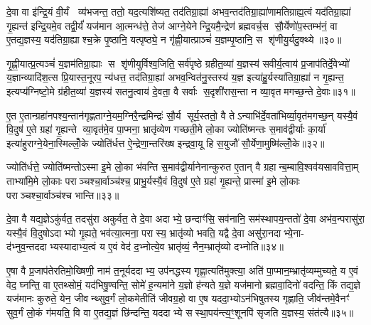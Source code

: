 {\anuvakamend[{अव॑ दाधार मि॒त्रेणै॒व प्री॑णाति॒ षट्च॑॥७॥}]}

दे॒वा वा इ॑न्द्रि॒यं वी॒र्यं  व्य॑भजन्त॒ ततो॒ यद॒त्यशि॑ष्यत॒ तद॑तिग्रा॒ह्या॑ अभव॒न्तद॑तिग्रा॒ह्या॑णामतिग्राह्य॒त्वं यद॑तिग्रा॒ह्या॑ गृ॒ह्यन्त॑ इन्द्रि॒यमे॒व तद्वी॒र्यं॑ यज॑मान आ॒त्मन्ध॑त्ते॒ तेज॑ आग्ने॒येनेन्द्रि॒यमै॒न्द्रेण॑ ब्रह्मवर्च॒स सौ॒र्येणो॑प॒स्तम्भ॑नं॒ वा ए॒तद्य॒ज्ञस्य॒ यद॑तिग्रा॒ह्याश्च॒क्रे पृ॒ष्ठानि॒ यत्पृष्ठ्ये॒ न गृ॑ह्णी॒यात्प्राञ्चं॑ य॒ज्ञम्पृ॒ष्ठानि॒ स शृ॑णीयु॒र्यदु॒क्थ्ये॥३०॥

गृ॒ह्णी॒यात्प्र॒त्यञ्चं॑ य॒ज्ञम॑तिग्रा॒ह्याः स शृ॑णीयुर्विश्व॒जिति॒ सर्व॑पृष्ठे ग्रहीत॒व्या॑ य॒ज्ञस्य॑ सवीर्य॒त्वाय॑ प्र॒जाप॑तिर्दे॒वेभ्यो॑ य॒ज्ञान्व्यादि॑श॒त्स प्रि॒यास्त॒नूरप॒ न्य॑धत्त॒ तद॑तिग्रा॒ह्या॑ अभव॒न्वित॑नु॒स्तस्य॑ य॒ज्ञ इत्या॑हु॒र्यस्या॑तिग्रा॒ह्या॑ न गृ॒ह्यन्त॒ इत्यप्य॑ग्निष्टो॒मे ग्र॑हीत॒व्या॑ य॒ज्ञस्य॑ सतनु॒त्वाय॑ दे॒वता॒ वै सर्वाः स॒दृशी॑रास॒न्ता न व्या॒वृतमगच्छ॒न्ते दे॒वाः॥३१॥

ए॒त ए॒तान्ग्रहा॑नपश्य॒न्तान॑गृह्णताग्ने॒यम॒ग्निरै॒न्द्रमिन्द्रः॑ सौ॒र्य सूर्य॒स्ततो॒ वै तेऽन्याभि॑र्दे॒वता॑भिर्व्या॒वृत॑मगच्छ॒न् यस्यै॒वं वि॒दुष॑ ए॒ते ग्रहा॑ गृ॒ह्यन्ते व्या॒वृत॑मे॒व पा॒प्मना॒ भ्रातृ॑व्येण गच्छती॒मे लो॒का ज्योति॑ष्मन्तः स॒माव॑द्वीर्याः का॒र्या॑ इत्या॑हुराग्ने॒येना॒स्मिल्लोँ॒के ज्योति॑र्धत्त ऐ॒न्द्रेणा॒न्तरि॑ख्ष इन्द्रवा॒यू हि स॒युजौ॑ सौ॒र्येणा॒मुष्मि॑ल्लोँ॒के॥३२॥

ज्योति॑र्धत्ते॒ ज्योति॑ष्मन्तोऽस्मा इ॒मे लो॒का भ॑वन्ति स॒माव॑द्वीर्यानेनान्कुरुत ए॒तान् वै ग्रहान्ब॒म्बावि॒श्वव॑यसाववित्ता॒म् ताभ्या॑मि॒मे लो॒काः पराञ्चश्चा॒र्वाञ्च॑श्च॒ प्राभु॒र्यस्यै॒वं वि॒दुष॑ ए॒ते ग्रहा॑ गृ॒ह्यन्ते॒ प्रास्मा॑ इ॒मे लो॒काः पराञ्चश्चा॒र्वाञ्च॑श्च भान्ति॥३३॥

{\anuvakamend[{उ॒क्थ्ये॑ दे॒वा अ॒मुष्मि॑ल्लोँ॒क एका॒न्नच॑त्वारि॒ꣳ॒शच्च॑॥८॥}]}

दे॒वा वै यद्य॒ज्ञेऽकु॑र्वत॒ तदसु॑रा अकुर्वत॒ ते दे॒वा अदाभ्ये॒ छन्दाꣳ॑सि॒ सव॑नानि॒ सम॑स्थापय॒न्ततो॑ दे॒वा अभ॑व॒न्परासु॑रा॒ यस्यै॒वं वि॒दुषोऽदाभ्यो गृ॒ह्यते॒ भव॑त्या॒त्मना॒ परास्य॒ भ्रातृ॑व्यो भवति॒ यद्वै दे॒वा असु॑रा॒नदाभ्ये॒ना- द॑भ्नुव॒न्तददाभ्यस्यादाभ्य॒त्वं य ए॒वं वेद॑ द॒भ्नोत्ये॒व भ्रातृ॑व्यं॒ नैन॒म्भ्रातृ॑व्यो दभ्नोति॥३४॥

ए॒षा वै प्र॒जाप॑तेरतिमो॒ख्षिणी॒ नाम॑ त॒नूर्यददाभ्य॒ उप॑नद्धस्य गृह्णा॒त्यति॑मुक्त्या॒ अति॑ पा॒प्मान॒म्भ्रातृ॑व्यम्मुच्यते॒ य ए॒वं वेद॒ घ्नन्ति॒ वा ए॒तथ्सोमं॒ यद॑भिषु॒ण्वन्ति॒ सोमे॑ ह॒न्यमा॑ने य॒ज्ञो ह॑न्यते य॒ज्ञे यज॑मानो ब्रह्मवा॒दिनो॑ वदन्ति॒ किं तद्य॒ज्ञे यज॑मानः कुरुते॒ येन॒ जीवन्थ्सुव॒र्गं लो॒कमेतीति॑ जीवग्र॒हो वा ए॒ष यददा॒भ्योऽन॑भिषुतस्य गृह्णाति॒ जीव॑न्तमे॒वैनꣳ॑ सुव॒र्गं लो॒कं ग॑मयति॒ वि वा ए॒तद्य॒ज्ञं छि॑न्दन्ति॒ यददाभ्ये सस्था॒पय॑न्त्य॒ꣳ॒शूनपि॑ सृजति य॒ज्ञस्य॒ संत॑त्यै॥३५॥

